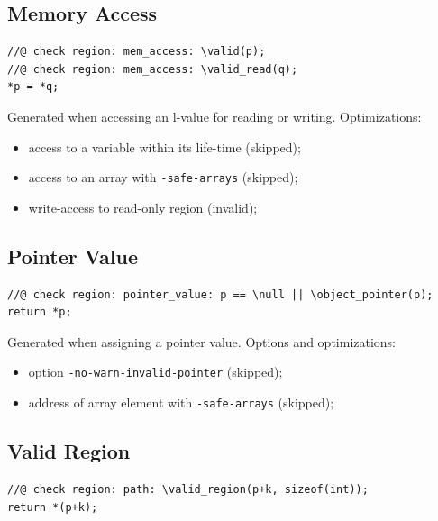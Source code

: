 \subsection{Memory Access}

\begin{lstlisting}
//@ check region: mem_access: \valid(p);
//@ check region: mem_access: \valid_read(q);
*p = *q;
\end{lstlisting}

Generated when accessing an l-value for reading or writing.
Optimizations:
\begin{itemize}
  \item access to a variable within its life-time (skipped);
  \item access to an array with \verb+-safe-arrays+ (skipped);
  \item write-access to read-only region (invalid);
\end{itemize}

\subsection{Pointer Value}

\begin{lstlisting}
//@ check region: pointer_value: p == \null || \object_pointer(p);
return *p;
\end{lstlisting}

Generated when assigning a pointer value. Options and optimizations:
\begin{itemize}
  \item option \verb+-no-warn-invalid-pointer+ (skipped);
  \item address of array element with \verb+-safe-arrays+ (skipped);
\end{itemize}

\subsection{Valid Region}

\begin{lstlisting}
//@ check region: path: \valid_region(p+k, sizeof(int));
return *(p+k);
\end{lstlisting}

